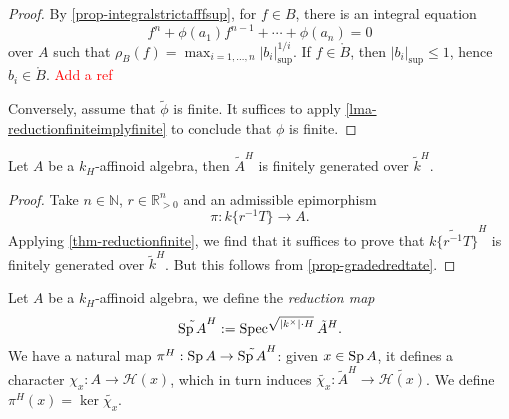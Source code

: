 \begin{proof}
    By \cref{prop-integralstrictafffsup}, for $f\in B$, there is an integral equation 
    \[
        f^n+\phi(a_1)f^{n-1}+\cdots+\phi(a_n)=0
    \]
    over $A$ such that $\rho_B(f)=\max_{i=1,\ldots,n}|b_i|_{\sup}^{1/i}$. If $f\in \mathring{B}$, then $|b_i|_{\sup}\leq 1$, hence $b_i\in \mathring{B}$. \textcolor{red}{Add a ref}

    Conversely, assume that $\tilde{\phi}$ is finite. It suffices to apply \cref{lma-reductionfiniteimplyfinite} to conclude that $\phi$ is finite.
\end{proof}

\begin{corollary}\label{cor-reductionfinitelygenerated}
    Let $A$ be a $k_H$-affinoid algebra, then $\tilde{A}^H$ is finitely generated over $\tilde{k}^H$.
\end{corollary}
\begin{proof}
    Take $n\in \mathbb{N}$, $r\in \mathbb{R}^n_{>0}$ and an admissible epimorphism 
    \[
        \pi:k\{r^{-1}T\}\rightarrow A.    
    \]
    Applying \cref{thm-reductionfinite}, we find that it suffices to prove that $\widetilde{k\{r^{-1}T\}}^H$ is finitely generated over $\tilde{k}^H$. But this follows from \cref{prop-gradedredtate}.
\end{proof}

\begin{definition}
    Let $A$ be a $k_H$-affinoid algebra, we define the \emph{reduction map}
    \[
        \tilde{\operatorname{Sp} A}^H:=\operatorname{Spec}^{\sqrt{|k^{\times}|\cdot H}}\tilde{A}^H.  
    \]
    We have a natural map $\pi^H:\Sp A\rightarrow \tilde{\Sp A}^H$: given $x\in \operatorname{Sp} A$, it defines a character $\chi_x:A\rightarrow \mathscr{H}(x)$, which in turn induces $\widetilde{\chi_x}:\tilde{A}^H\rightarrow \widetilde{\mathscr{H}(x)}$. We define $\pi^H(x)=\ker \widetilde{\chi_x}$.
\end{definition}

\iffalse
\begin{proposition}
    Let $A$ be a $k_H$-affinoid algebra, then $\pi^H:\Sp A\rightarrow \tilde{\Sp A}^H$ is anti-continuous.
\end{proposition}
\begin{proof}
    Let $f\in A$ be an element with $\rho(f)>0$. We need to show that the inverse image of the Zariski closed subset of $\tilde{\Sp A}^H$ defined by $\tilde{f}=0$ is open. Now $x\in \pi^{H,-1}(V(\tilde{f}))$ if and only if $\widetilde{\chi_x}(\tilde{f})=0$. This happens if and only if $\rho(\chi_x(f))<\rho(f)$. Equivalently, the latter condition means $|f(x)|<\rho(f)$, which obviously defines an open subset of $\Sp A$.
\end{proof}
\fi


